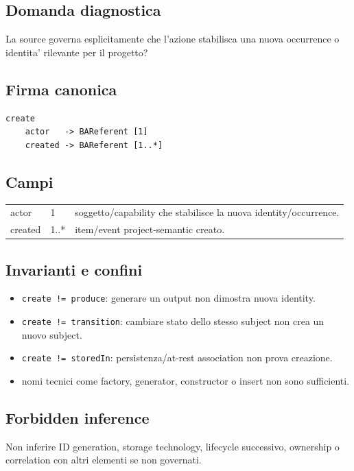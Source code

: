 \documentclass[11pt,a4paper]{article}
\begin{document}
\subsection{Domanda diagnostica}
La source governa esplicitamente che l'azione stabilisca una nuova occurrence o identita' rilevante per il progetto?

\subsection{Firma canonica}
\begin{lstlisting}
create
    actor   -> BAReferent [1]
    created -> BAReferent [1..*]
\end{lstlisting}

\subsection{Campi}
\begin{tabularx}{\textwidth}{L{36mm}L{24mm}Y}
\toprule
actor & 1 & soggetto/capability che stabilisce la nuova identity/occurrence. \\
created & 1..* & item/event project-semantic creato. \\
\bottomrule
\end{tabularx}

\subsection{Invarianti e confini}
\begin{itemize}
  \item \texttt{create != produce}: generare un output non dimostra nuova identity.
  \item \texttt{create != transition}: cambiare stato dello stesso subject non crea un nuovo subject.
  \item \texttt{create != storedIn}: persistenza/at-rest association non prova creazione.
  \item nomi tecnici come factory, generator, constructor o insert non sono sufficienti.
\end{itemize}

\subsection{Forbidden inference}
Non inferire ID generation, storage technology, lifecycle successivo, ownership o correlation con altri elementi se non governati.
\end{document}
